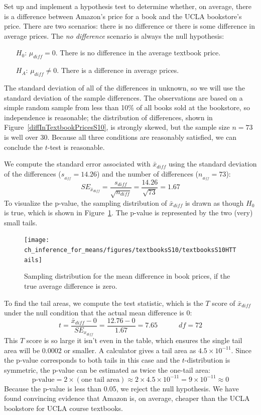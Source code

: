 \begin{example}{Set up and implement a hypothesis test to determine whether, on average, there is a difference between Amazon's price for a book and the UCLA bookstore's price.}
\label{htForDiffInUCLAAndAmazonTextbookPrices}
There are two scenarios: there is no difference or there is some difference in average prices. The \emph{no difference} scenario is always the null hypothesis:
\begin{itemize}
\setlength{\itemsep}{0mm}
\item[$H_0$:] $\mu_{diff}=0$. There is no difference in the average textbook price.
\item[$H_A$:] $\mu_{diff} \neq 0$. There is a difference in average prices.
\end{itemize}
The standard deviation of all of the differences in unknown, so we will use the standard deviation of the sample differences. The observations are based on a simple random sample from less than 10\% of all books sold at the bookstore, so independence is reasonable; the distribution of differences, shown in Figure~\ref{diffInTextbookPricesS10}, is strongly skewed, but the sample size $n=73$ is well over 30. Because all three conditions are reasonably satisfied, we can conclude the $t$-test is reasonable.

We compute the standard error associated with $\bar{x}_{diff}$ using the standard deviation of the differences ($s_{_{diff}}=14.26$) and the number of differences ($n_{_{diff}}=73$):
$$SE_{\bar{x}_{diff}} = \frac{s_{diff}}{\sqrt{n_{diff}}} = \frac{14.26}{\sqrt{73}} = 1.67$$
To visualize the p-value, the sampling distribution of $\bar{x}_{diff}$ is drawn as though $H_0$ is true, which is shown in Figure~\ref{textbooksS10HTTails}. The p-value is represented by the two (very) small tails.

\begin{figure}
\centering
\texttt{[image: ch\_inference\_for\_means/figures/textbooksS10/textbooksS10HTTails]}
\caption{Sampling distribution for the mean difference in book prices, if the true average difference is zero.}
\label{textbooksS10HTTails}
\end{figure}

To find the tail areas, we compute the test statistic, which is the $T$ score of $\bar{x}_{diff}$ under the null condition that the actual mean difference is 0:
$$t = \frac{\bar{x}_{diff} - 0}{SE_{x_{diff}}} = \frac{12.76 - 0}{1.67} = 7.65  \quad \quad \quad df=72$$
This $T$ score is so large it isn't even in the table, which ensures the single tail area will be 0.0002 or smaller. A calculator gives a tail area as $4.5\times 10^{-11}$. Since the p-value corresponds to both tails in this case and the $t$-distribution is symmetric, the p-value can be estimated as twice the one-tail area:
$$\text{p-value} = 2\times (\text{one tail area}) \approx 2\times 4.5\times 10^{-11} = 9\times 10^{-11}\approx 0$$
Because the p-value is less than 0.05, we reject the null hypothesis. We have found convincing evidence that Amazon is, on average, cheaper than the UCLA bookstore for UCLA course textbooks.
\end{example}

